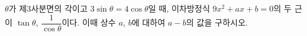 $\theta$가 제$3$사분면의 각이고 $3\sin\theta=4\cos\theta$일 때, 이차방정식 $9x^2+ax+b=0$의 두 근이 $\tan\theta$, $\dfrac{1}{\cos\theta}$이다. 이때 상수 $a$, $b$에 대하여 $a-b$의 값을 구하시오.
